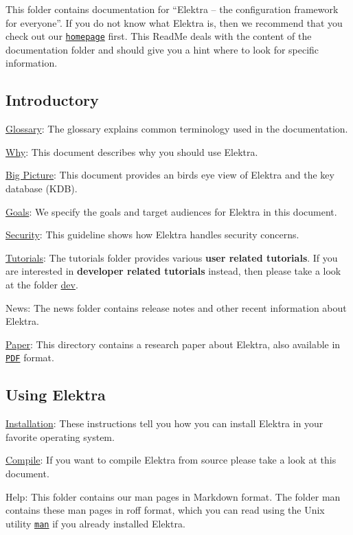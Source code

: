 This folder contains documentation for “\+Elektra – the configuration framework for everyone”. If you do not know what Elektra is, then we recommend that you check out our \href{https://www.libelektra.org/home}{\tt homepage} first. This Read\+Me deals with the content of the documentation folder and should give you a hint where to look for specific information.

\subsection*{Introductory}


\begin{DoxyItemize}
\item \hyperlink{doc_help_elektra-glossary_md}{Glossary}\+: The glossary explains common terminology used in the documentation.
\item \hyperlink{doc_WHY_md}{Why}\+: This document describes why you should use Elektra.
\item \hyperlink{doc_BIGPICTURE_md}{Big Picture}\+: This document provides an birds eye view of Elektra and the key database (K\+DB).
\item \hyperlink{doc_GOALS_md}{Goals}\+: We specify the goals and target audiences for Elektra in this document.
\item \hyperlink{doc_SECURITY_md}{Security}\+: This guideline shows how Elektra handles security concerns.
\item \hyperlink{md_doc_tutorials_README_doc_tutorials_README_md}{Tutorials}\+: The tutorials folder provides various {\bfseries user related tutorials}. If you are interested in {\bfseries developer related tutorials} instead, then please take a look at the folder \hyperlink{md_doc_dev_README_doc_dev_README_md}{dev}.
\item News\+: The news folder contains release notes and other recent information about Elektra.
\item \hyperlink{doc_paper_README_md}{Paper}\+: This directory contains a research paper about Elektra, also available in \href{http://joss.theoj.org/papers/10.21105/joss.00044}{\tt P\+DF} format.
\end{DoxyItemize}

\subsection*{Using Elektra}


\begin{DoxyItemize}
\item \hyperlink{doc_INSTALL_md}{Installation}\+: These instructions tell you how you can install Elektra in your favorite operating system.
\item \hyperlink{doc_COMPILE_md}{Compile}\+: If you want to compile Elektra from source please take a look at this document.
\item Help\+: This folder contains our man pages in Markdown format. The folder man contains these man pages in roff format, which you can read using the Unix utility \href{https://en.wikipedia.org/wiki/Man_page}{\tt {\ttfamily man}} if you already installed Elektra.
\end{DoxyItemize}

